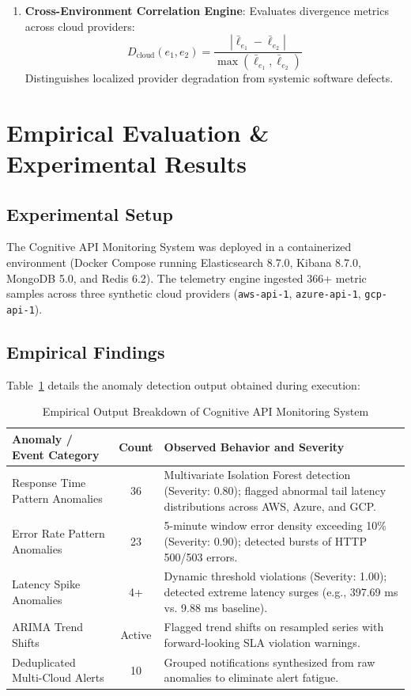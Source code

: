 \documentclass[11pt,a4paper]{article}
\begin{document}
\begin{enumerate}[leftmargin=*]
    \item \textbf{Cross-Environment Correlation Engine}: Evaluates divergence metrics across cloud providers:
    \begin{equation}
        D_{\text{cloud}}(e_1, e_2) = \frac{|\bar{\ell}_{e_1} - \bar{\ell}_{e_2}|}{\max(\bar{\ell}_{e_1}, \bar{\ell}_{e_2})}
    \end{equation}
    Distinguishes localized provider degradation from systemic software defects.
\end{enumerate}

\section{Empirical Evaluation \& Experimental Results}

\subsection{Experimental Setup}
The Cognitive API Monitoring System was deployed in a containerized environment (Docker Compose running Elasticsearch 8.7.0, Kibana 8.7.0, MongoDB 5.0, and Redis 6.2). The telemetry engine ingested 366+ metric samples across three synthetic cloud providers (\texttt{aws-api-1}, \texttt{azure-api-1}, \texttt{gcp-api-1}).

\subsection{Empirical Findings}
Table~\ref{tab:empirical_run} details the anomaly detection output obtained during execution:

\begin{table}[htbp]
\centering
\caption{Empirical Output Breakdown of Cognitive API Monitoring System}
\label{tab:empirical_run}
\small
\begin{tabularx}{\textwidth}{lcp{8.5cm}}
\toprule
\textbf{Anomaly / Event Category} & \textbf{Count} & \textbf{Observed Behavior and Severity} \\
\midrule
Response Time Pattern Anomalies & 36 & Multivariate Isolation Forest detection (Severity: 0.80); flagged abnormal tail latency distributions across AWS, Azure, and GCP. \\
Error Rate Pattern Anomalies & 23 & 5-minute window error density exceeding 10\% (Severity: 0.90); detected bursts of HTTP 500/503 errors. \\
Latency Spike Anomalies & 4+ & Dynamic threshold violations (Severity: 1.00); detected extreme latency surges (e.g., 397.69 ms vs. 9.88 ms baseline). \\
ARIMA Trend Shifts & Active & Flagged trend shifts on resampled series with forward-looking SLA violation warnings. \\
Deduplicated Multi-Cloud Alerts & 10 & Grouped notifications synthesized from raw anomalies to eliminate alert fatigue. \\
\bottomrule
\end{tabularx}
\end{table}
\end{document}
